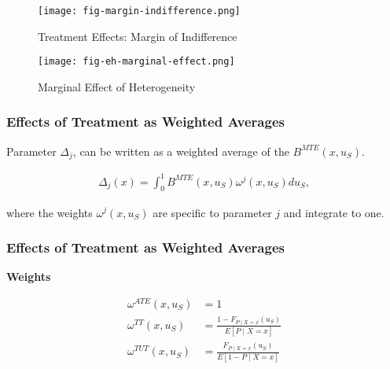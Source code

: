 \begin{frame}

\begin{figure}[htp]\centering
	\caption{Treatment Effects: Margin of Indifference}\label{Margin Indifference}\scalebox{0.35}
	{\texttt{[image: fig-margin-indifference.png]}}
\end{figure}

\end{frame}


\begin{frame}

\begin{figure}[htp]\centering
	\caption{Marginal Effect of Heterogeneity}\label{Marginal Effect of Heterogeneity}\scalebox{0.35}
	{\texttt{[image: fig-eh-marginal-effect.png]}}
\end{figure}

\end{frame}


\begin{frame}
\frametitle{Effects of Treatment as Weighted Averages}

Parameter \(\Delta_j\), can be written as a weighted average of the
\(B^{MTE}(x, u_S)\).

\begin{align*}
\Delta_j(x) = \int_0^1 B^{MTE}(x, u_S) \omega^j(x, u_S) du_S,
\end{align*}

where the weights \(\omega^j(x, u_S)\) are specific to parameter \(j\)
and integrate to one.
\end{frame}

\begin{frame}
\frametitle{Effects of Treatment as Weighted Averages}
\textbf{Weights}

\begin{align*}
 \omega^{ATE}(x, u_S) & = 1 \\
 \omega^{TT}(x, u_S) & = \frac{1 - F_{P\mid X=x}(u_S)}{E[P \mid X = x]}\\
 \omega^{TUT}(x, u_S) & = \frac{F_{P\mid X=x}(u_S)}{E[1 - P \mid X = x]}
\end{align*}

\end{frame}


